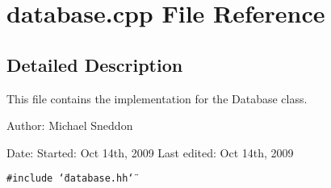 \section{database.cpp File Reference}
\label{database_8cpp}


\subsection{Detailed Description}
This file contains the implementation for the Database class.

\begin{Desc}
\item[Author:]Michael Sneddon\end{Desc}
\begin{Desc}
\item[Date:]Started: Oct 14th, 2009 Last edited: Oct 14th, 2009 \end{Desc}


{\tt \#include \char`\"{}database.hh\char`\"{}}\par
